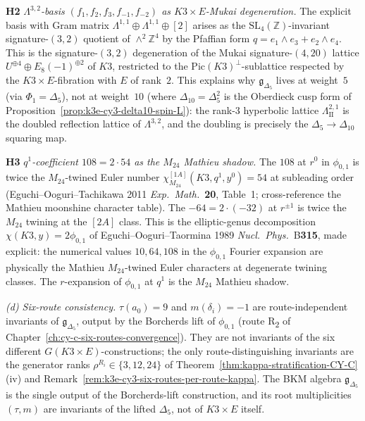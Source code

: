 \begin{remark}
\textbf{H2} \textit{$\Lambda^{3,2}$-basis $(f_1,f_2,f_3,f_{-1},f_{-2})$ as $K3\times E$-Mukai degeneration.} The explicit basis with Gram matrix $\Lambda^{1,1}\oplus\Lambda^{1,1}\oplus[2]$ arises as the $\mathrm{SL}_4(\mathbb Z)$-invariant signature-$(3,2)$ quotient of $\wedge^2\mathbb Z^4$ by the Pfaffian form $q = e_1\wedge e_3 + e_2\wedge e_4$. This is the signature-$(3,2)$ degeneration of the Mukai signature-$(4,20)$ lattice $U^{\oplus 4}\oplus E_8(-1)^{\oplus 2}$ of $K3$, restricted to the $\mathrm{Pic}(K3)^{\perp}$-sublattice respected by the $K3\times E$-fibration with $E$ of rank~$2$. This explains why $\mathfrak g_{\Delta_5}$ lives at weight~$5$ (via $\Phi_1 = \Delta_5$), not at weight~$10$ (where $\Delta_{10} = \Delta_5^2$ is the Oberdieck cusp form of Proposition~\ref{prop:k3e-cy3-delta10-spin-L}): the rank-$3$ hyperbolic lattice $\Lambda^{2,1}_{\mathrm{II}}$ is the doubled reflection lattice of $\Lambda^{3,2}$, and the doubling is precisely the $\Delta_5\to\Delta_{10}$ squaring map.

\textbf{H3} \textit{$q^1$-coefficient $108 = 2\cdot 54$ as the $M_{24}$ Mathieu shadow.} The $108$ at $r^0$ in $\phi_{0,1}$ is twice the $M_{24}$-twined Euler number $\chi_{M_{24}}^{[1A]}(K3, q^1, y^0) = 54$ at subleading order (Eguchi--Ooguri--Tachikawa 2011 \emph{Exp.\ Math.}~\textbf{20}, Table~1; cross-reference the Mathieu moonshine character table). The $-64 = 2\cdot(-32)$ at $r^{\pm 1}$ is twice the $M_{24}$ twining at the $[2A]$ class. This is the elliptic-genus decomposition $\chi(K3, y) = 2\phi_{0,1}$ of Eguchi--Ooguri--Taormina 1989 \emph{Nucl.\ Phys.}~B\textbf{315}, made explicit: the numerical values $10, 64, 108$ in the $\phi_{0,1}$ Fourier expansion are physically the Mathieu $M_{24}$-twined Euler characters at degenerate twining classes. The $r$-expansion of $\phi_{0,1}$ at $q^1$ is the $M_{24}$ Mathieu shadow.

\emph{(d) Six-route consistency.} $\tau(a_0) = 9$ and $m(\delta_i) = -1$ are route-independent invariants of $\mathfrak g_{\Delta_5}$, output by the Borcherds lift of $\phi_{0,1}$ (route R\textsubscript{2} of Chapter~\ref{ch:cy-c-six-routes-convergence}). They are not invariants of the six different $G(K3\times E)$-constructions; the only route-distinguishing invariants are the generator ranks $\rho^{R_i}\in\{3, 12, 24\}$ of Theorem~\ref{thm:kappa-stratification-CY-C}(iv) and Remark~\ref{rem:k3e-cy3-six-routes-per-route-kappa}. The BKM algebra $\mathfrak g_{\Delta_5}$ is the single output of the Borcherds-lift construction, and its root multiplicities $(\tau, m)$ are invariants of the lifted $\Delta_5$, not of $K3\times E$ itself.


\end{remark}
